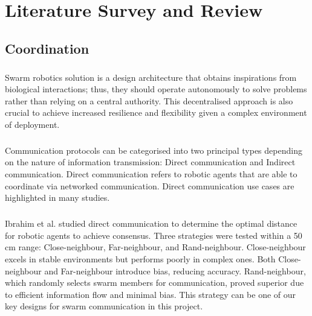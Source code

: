 \chapter{Literature Survey and Review}

\section{Coordination}

\paragraph*{}
Swarm robotics solution is a design architecture that obtains inspirations from biological interactions; thus, they should operate autonomously to solve problems rather than relying on a central authority\cite{turkler2022usage}. This decentralised approach is also crucial to achieve increased resilience and flexibility given a complex environment of deployment\cite{das2024bio}.

\paragraph*{}
Communication protocols can be categorised into two principal types depending on the nature of information transmission: Direct communication and Indirect communication\cite{das2024bio}. Direct communication refers to robotic agents that are able to coordinate via networked communication. Direct communication use cases are highlighted in many studies.

\paragraph*{}
Ibrahim et al. \cite{ibrahim2024enhancing} studied direct communication to determine the optimal distance for robotic agents to achieve consensus. Three strategies were tested within a 50 cm range: Close-neighbour, Far-neighbour, and Rand-neighbour. Close-neighbour excels in stable environments but performs poorly in complex ones. Both Close-neighbour and Far-neighbour introduce bias, reducing accuracy. Rand-neighbour, which randomly selects swarm members for communication, proved superior due to efficient information flow and minimal bias. This strategy can be one of our key designs for swarm communication in this project.

